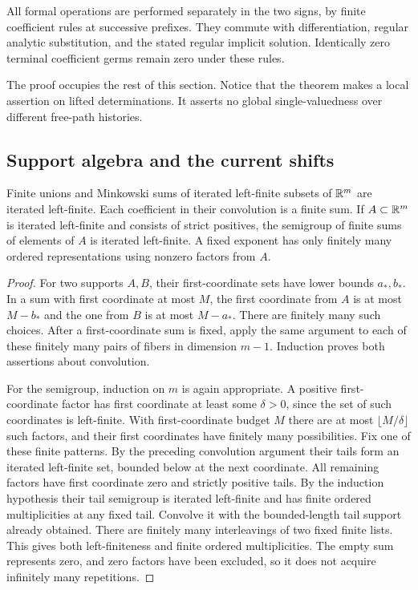 \begin{theorem}
All formal operations are performed separately in the two signs, by finite
coefficient rules at successive prefixes.  They commute with differentiation,
regular analytic substitution, and the stated regular implicit solution.
Identically zero terminal coefficient germs remain zero under these rules.
\end{theorem}

The proof occupies the rest of this section.  Notice that the theorem makes
a local assertion on lifted determinations.  It asserts no global
single-valuedness over different free-path histories.

\subsection{Support algebra and the current shifts}

\begin{lemma}
\label{lem:calculus-support}
Finite unions and Minkowski sums of iterated left-finite subsets of
$\mathbb{R}^m$ are iterated left-finite.  Each coefficient in their convolution
is a finite sum.  If $A\subset\mathbb{R}^m$ is iterated left-finite and consists of
strict positives, the semigroup of finite sums of elements of $A$ is
iterated left-finite.  A fixed exponent has only finitely many ordered
representations using nonzero factors from $A$.
\end{lemma}

\begin{proof}
For two supports $A,B$, their first-coordinate sets have lower bounds
$a_*,b_*$.  In a sum with first coordinate at most $M$, the first coordinate
from $A$ is at most $M-b_*$ and the one from $B$ is at most $M-a_*$.  There
are finitely many such choices.  After a first-coordinate sum is fixed,
apply the same argument to each of these finitely many pairs of fibers in
dimension $m-1$.  Induction proves both assertions about convolution.

For the semigroup, induction on $m$ is again appropriate.  A positive
first-coordinate factor has first coordinate at least some $\delta>0$,
since the set of such coordinates is left-finite.  With first-coordinate
budget $M$ there are at most $\lfloor M/\delta\rfloor$ such factors, and
their first coordinates have finitely many possibilities.  Fix one of
these finite patterns.  By the preceding convolution argument their tails
form an iterated left-finite set, bounded below at the next coordinate.
All remaining factors have first coordinate zero and strictly positive
tails.  By the induction hypothesis their tail semigroup is iterated
left-finite and has finite ordered multiplicities at any fixed tail.
Convolve it with the bounded-length tail support already obtained.
There are finitely many interleavings of two fixed finite lists.
This gives both left-finiteness and finite ordered multiplicities.
The empty sum represents zero, and zero factors have been excluded, so it
does not acquire infinitely many repetitions.
\end{proof}

